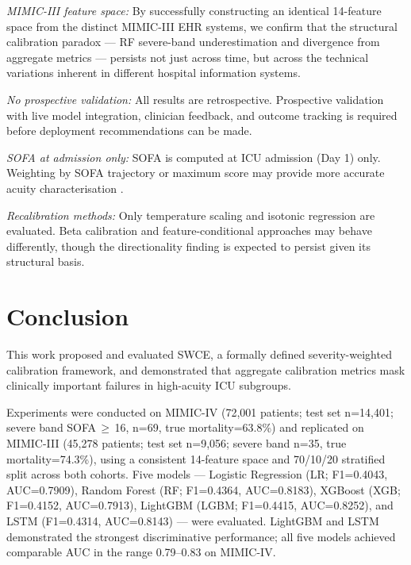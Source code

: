 \documentclass{ieeeaccess}
\begin{document}
\textit{MIMIC-III feature space:} By successfully constructing an identical 14-feature space from the distinct MIMIC-III EHR systems, we confirm that the structural calibration paradox — RF severe-band underestimation and divergence from aggregate metrics — persists not just across time, but across the technical variations inherent in different hospital information systems.

\textit{No prospective validation:} All results are retrospective. Prospective validation with live model integration, clinician feedback, and outcome tracking is required before deployment recommendations can be made.

\textit{SOFA at admission only:} SOFA is computed at ICU admission (Day 1) only. Weighting by SOFA trajectory or maximum score may provide more accurate acuity characterisation \cite{b21}.

\textit{Recalibration methods:} Only temperature scaling and isotonic regression are evaluated. Beta calibration \cite{b9} and feature-conditional approaches may behave differently, though the directionality finding is expected to persist given its structural basis.

\section{Conclusion}
\label{sec:conclusion}

This work proposed and evaluated SWCE, a formally defined severity-weighted calibration framework, and demonstrated that aggregate calibration metrics mask clinically important failures in high-acuity ICU subgroups.

Experiments were conducted on MIMIC-IV (72,001 patients; test set n=14,401; severe band SOFA\,$\geq$\,16, n=69, true mortality=63.8\%) and replicated on MIMIC-III (45,278 patients; test set n=9,056; severe band n=35, true mortality=74.3\%), using a consistent 14-feature space and 70/10/20 stratified split across both cohorts. Five models --- Logistic Regression (LR; F1=0.4043, AUC=0.7909), Random Forest (RF; F1=0.4364, AUC=0.8183), XGBoost (XGB; F1=0.4152, AUC=0.7913), LightGBM (LGBM; F1=0.4415, AUC=0.8252), and LSTM (F1=0.4314, AUC=0.8143) --- were evaluated. LightGBM and LSTM demonstrated the strongest discriminative performance; all five models achieved comparable AUC in the range 0.79--0.83 on MIMIC-IV.
\end{document}
